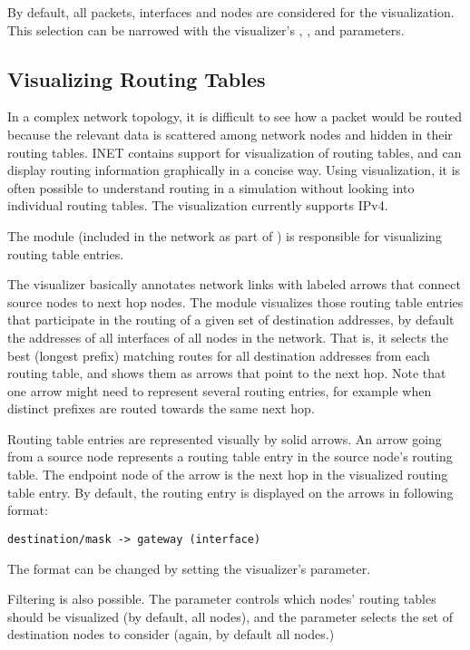 By default, all packets, interfaces and nodes are considered for the
visualization. This selection can be narrowed with the visualizer's
, , and  parameters.


\subsection{Visualizing Routing Tables}

In a complex network topology, it is difficult to see how a packet would be
routed because the relevant data is scattered among network nodes and hidden in
their routing tables. INET contains support for visualization of routing tables,
and can display routing information graphically in a concise way. Using
visualization, it is often possible to understand routing in a simulation
without looking into individual routing tables. The visualization currently
supports IPv4.

The  module (included in the network as part of
) is responsible for visualizing routing table entries.

The visualizer basically annotates network links with labeled arrows that
connect source nodes to next hop nodes. The module visualizes those routing
table entries that participate in the routing of a given set of destination
addresses, by default the addresses of all interfaces of all nodes in the
network. That is, it selects the best (longest prefix) matching routes for all
destination addresses from each routing table, and shows them as arrows that
point to the next hop. Note that one arrow might need to represent several
routing entries, for example when distinct prefixes are routed towards the same
next hop.

Routing table entries are represented visually by solid arrows. An arrow going
from a source node represents a routing table entry in the source node's routing
table. The endpoint node of the arrow is the next hop in the visualized routing
table entry. By default, the routing entry is displayed on the arrows in
following format:

\begin{verbatim}
destination/mask -> gateway (interface)
\end{verbatim}

The format can be changed by setting the visualizer's  parameter.

Filtering is also possible. The  parameter controls which nodes'
routing tables should be visualized (by default, all nodes), and the
 parameter selects the set of destination nodes to consider
(again, by default all nodes.)

